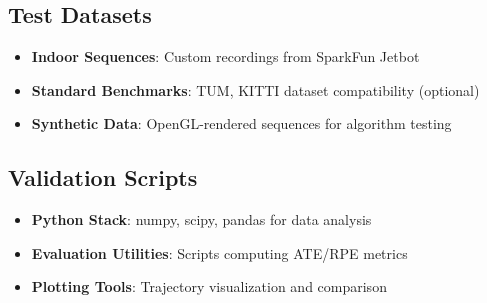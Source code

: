 \subsection{Test Datasets}
\begin{itemize}
    \item \textbf{Indoor Sequences}: Custom recordings from SparkFun Jetbot
    \item \textbf{Standard Benchmarks}: TUM, KITTI dataset compatibility (optional)
    \item \textbf{Synthetic Data}: OpenGL-rendered sequences for algorithm testing
\end{itemize}

\subsection{Validation Scripts}
\begin{itemize}
    \item \textbf{Python Stack}: numpy, scipy, pandas for data analysis
    \item \textbf{Evaluation Utilities}: Scripts computing ATE/RPE metrics
    \item \textbf{Plotting Tools}: Trajectory visualization and comparison
\end{itemize}

